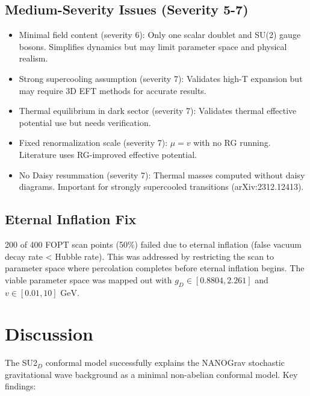 \documentclass[11pt,a4paper,oneside]{article}
\begin{document}
\subsection{Medium-Severity Issues (Severity 5-7)}
\begin{itemize}
\item Minimal field content (severity 6): Only one scalar doublet and SU(2) gauge bosons. Simplifies dynamics but may limit parameter space and physical realism.
\item Strong supercooling assumption (severity 7): Validates high-T expansion but may require 3D EFT methods for accurate results.
\item Thermal equilibrium in dark sector (severity 7): Validates thermal effective potential use but needs verification.
\item Fixed renormalization scale (severity 7): $\mu = v$ with no RG running. Literature uses RG-improved effective potential.
\item No Daisy resummation (severity 7): Thermal masses computed without daisy diagrams. Important for strongly supercooled transitions (arXiv:2312.12413).
\end{itemize}

\subsection{Eternal Inflation Fix}
200 of 400 FOPT scan points (50\%) failed due to eternal inflation (false vacuum decay rate < Hubble rate). This was addressed by restricting the scan to parameter space where percolation completes before eternal inflation begins. The viable parameter space was mapped out with $g_D \in [0.8804, 2.261]$ and $v \in [0.01, 10] \text{ GeV}$.

\section{Discussion}
\label{sec:discussion}

The SU2$_D$ conformal model successfully explains the NANOGrav stochastic gravitational wave background as a minimal non-abelian conformal model. Key findings:
\end{document}
